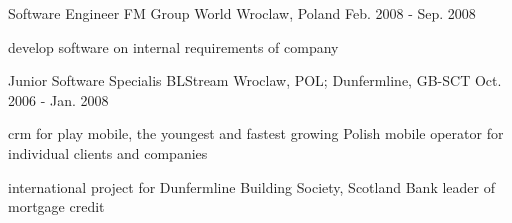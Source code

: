 \begin{cventries}
  \cventry
    {Software Engineer} %
    {FM Group World} %
    {Wroclaw, Poland} %
    {Feb. 2008 - Sep. 2008} %
    {
      \begin{cvitems} %
        \item {develop software on internal requirements of company}
      \end{cvitems}
    }

  \cventry
    {Junior Software Specialis} %
    {BLStream} %
    {Wroclaw, POL; Dunfermline, GB-SCT} %
    {Oct. 2006 - Jan. 2008} %
    {
      \begin{cvitems} %
        \item {crm for play mobile, the youngest and fastest growing Polish mobile operator for individual clients and companies}
        \item {international project for Dunfermline Building Society, Scotland Bank leader of mortgage credit}
      \end{cvitems}
    }

\end{cventries}
